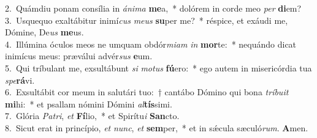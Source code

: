 {2.~}Quámdiu ponam consília in \textit{á}\textit{ni}\textit{ma} \textbf{me}a,~* dolórem in corde meo \textit{per} \textbf{di}em?\\
{3.~}Usquequo exaltábitur inimí\textit{cus} \textit{me}\textit{us} \textbf{su}per me?~* réspice, et exáudi me, Dómine, De\textit{us} \textbf{me}us.\\
{4.~}Illúmina óculos meos ne umquam obdór\textit{mi}\textit{am} \textit{in} \textbf{mor}te:~* nequándo dicat inimícus meus: præválui advér\textit{sus} \textbf{e}um.\\
{5.~}Qui tríbulant me, exsultábunt \textit{si} \textit{mo}\textit{tus} \textbf{fú}ero:~* ego autem in misericórdia tua \textit{spe}\textbf{rá}vi.\\
{6.~}Exsultábit cor meum in salutári tuo:~† cantábo Dómino qui bona \textit{trí}\textit{bu}\textit{it} \textbf{mi}hi:~* et psallam nómini Dómini \textit{al}\textbf{tís}simi.\\
{7.~}Glória \textit{Pa}\textit{tri}, \textit{et} \textbf{Fí}lio,~* et Spirítu\textit{i} \textbf{San}cto.\\
{8.~}Sicut erat in princípio, \textit{et} \textit{nunc}, \textit{et} \textbf{sem}per,~* et in sǽcula sæculó\textit{rum}. \textbf{A}men.\\
